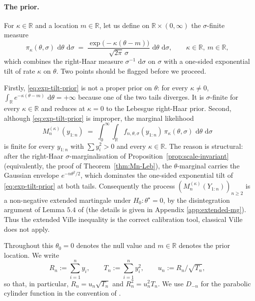 \documentclass[12pt, a4paper]{report}
\newcommand{\dd}{\,\mathrm{d}}
\newcommand{\1}{\mathbf{1}}
\begin{document}
\paragraph{The prior.} For $\kappa\in\mathbb{R}$ and a location $m\in\mathbb{R}$, let us define on $\mathbb{R}\times(0,\infty)$ the $\sigma$-finite measure
\begin{equation}\label{eq:exp-tilt-prior}
  \pi_\kappa(\theta,\sigma)\,\dd\theta\,\dd\sigma
  \;=\;\frac{\exp\!\bigl(-\kappa(\theta-m)\bigr)}{\sqrt{2\pi}\,\sigma}\,
  \dd\theta\,\dd\sigma,
  \qquad \kappa\in\mathbb{R},\ m\in\mathbb{R},
\end{equation}
which combines the right-Haar measure $\sigma^{-1}\,\dd\sigma$ on $\sigma$
with a one-sided exponential tilt of rate $\kappa$ on $\theta$. Two points should be flagged before we proceed.

Firstly, \eqref{eq:exp-tilt-prior} is not a proper prior on $\theta$: for every $\kappa\neq 0$, $\int_\mathbb{R} e^{-\kappa(\theta-m)}\,
\dd\theta=+\infty$ because one of the two tails diverges. It is $\sigma$-finite for every $\kappa\in\mathbb{R}$ and reduces at $\kappa=0$ to the
Lebesgue right-Haar prior. Second, although \eqref{eq:exp-tilt-prior} is improper, the marginal
likelihood
\begin{equation}\label{eq:Mkappa-def}
  M_n^{(\kappa)}(y_{1:n})
  \;=\;\int_0^\infty\!\int_\mathbb{R} f_{n,\theta,\sigma}(y_{1:n})\,
  \pi_\kappa(\theta,\sigma)\,\dd\theta\,\dd\sigma
\end{equation}
is finite for every $y_{1:n}$ with $\sum y_i^2>0$ and every $\kappa\in\mathbb{R}$. The reason is structural: after the right-Haar $\sigma$-marginalisation of Proposition~\ref{prop:scale-invariant} (equivalently, the proof of Theorem~\ref{thm:Mn-Leb}), the $\theta$-marginal carries the Gaussian envelope $e^{-n\theta^2/2}$, which dominates the one-sided exponential
tilt of \eqref{eq:exp-tilt-prior} at both tails. Consequently the
process $(M_n^{(\kappa)}(Y_{1:n}))_{n\geq 2}$ is a non-negative extended martingale under $H_0:\theta^\star=0$, by the disintegration argument of Lemma $5.4$ of \cite{Wang2025} (the details is given in Appendix \ref{app:extended-mg}). Thus the extended Ville inequality is the correct calibration tool, classical Ville does not apply. 

Throughout this $\theta_0=0$ denotes the null value and $m\in\mathbb{R}$ denotes the prior location. We
write
\[
  R_n := \sum_{i=1}^n y_i,\qquad
  T_n := \sum_{i=1}^n y_i^2,\qquad
  u_n := R_n/\sqrt{T_n},
\]
so that, in particular, $R_n=u_n\sqrt{T_n}$ and $R_n^2 = u_n^2 T_n$. We use $D_{-n}$ for the parabolic cylinder function in the convention of
\cite{GradshteynRyzhik2014}.
\end{document}
